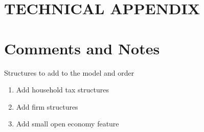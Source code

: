\documentclass[letterpaper,12pt]{article}
\theoremstyle{definition}
\begin{document}
  \clearpage


\newpage




\newpage
\renewcommand{\theequation}{T.\arabic{section}.\arabic{equation}}
\renewcommand{\thesection}{T-\arabic{section}}   %
\setcounter{equation}{0}                         %
\setcounter{section}{0}                          %
\section*{TECHNICAL APPENDIX}


\section{Comments and Notes}\label{TAppComments}

  \noindent Structures to add to the model and order
  \begin{enumerate}
    \item Add household tax structures
    \item Add firm structures
    \item Add small open economy feature
  \end{enumerate}
\end{document}
